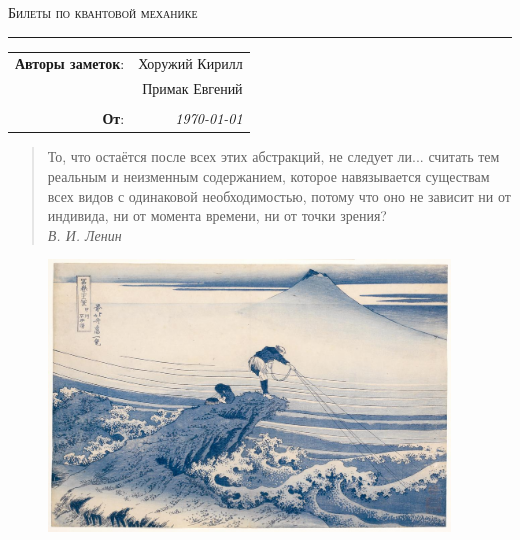
\begin{center}
    \LARGE \textsc{Билеты по квантовой механике}
\end{center}

\hrule

\phantom{42}

\begin{flushright}
    \begin{tabular}{rr}
        \textbf{Авторы заметок}: 
        & Хоружий Кирилл \\
        & Примак Евгений \\
        & \\
        \textbf{От}: &
        \textit{\today}\\
    \end{tabular}
\end{flushright}
\thispagestyle{empty}


\phantom{42}

\noindent
\begin{minipage}{0.7\textwidth}
     \begin{quotation}
        То, что остаётся после всех этих абстракций, не следует ли... считать тем реальным и неизменным содержанием, которое навязывается существам всех видов с одинаковой необходимостью, потому что оно не зависит ни от индивида, ни от момента времени, ни от точки зрения? \\
        \phantom{42} \hfill \textit{В. И. Ленин}
    \end{quotation}
\end{minipage}


\vfill


\begin{figure}[h]
    \centering
    \includegraphics[width=0.95\textwidth]{figures/pic1.jpeg}
\end{figure}




\newpage

\tableofcontents
\newpage
